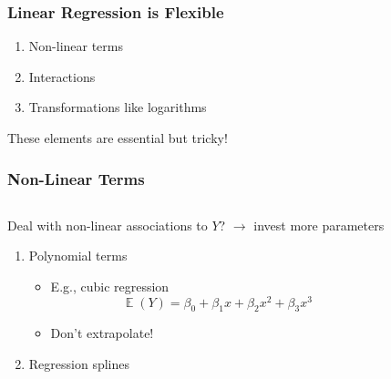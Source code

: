 \documentclass[
    utf8,
    aspectratio=169
]{beamer}  %
\DeclareMathOperator{\E}{\mathbb{E}}  %
\begin{document}
\begin{frame}
	\frametitle{Linear Regression is Flexible}
	\begin{enumerate}
		\item Non-linear terms
		\item Interactions
		\item Transformations like logarithms
	\end{enumerate}
	
	\vfill
	
	\begin{alertblock}{These elements are essential but tricky!}
	\end{alertblock}
\end{frame}

\begin{frame}
	\frametitle{Non-Linear Terms}
	\begin{columns}
		\begin{block}{Deal with non-linear associations to $Y$?} $\rightarrow$ invest more parameters
		\begin{enumerate}
			\item Polynomial terms
			\begin{itemize}
				\item E.g., cubic regression
				$$
					\E(Y) = \beta_0 + \beta_1 x + \beta_2 x^2 + \beta_3 x^3
				$$
				\item Don't extrapolate!
			\end{itemize}
			\item Regression splines
		\end{enumerate}
		\end{block}
		

\end{columns}
\end{frame}
\end{document}
